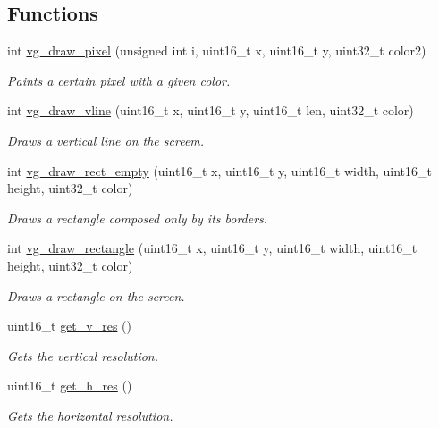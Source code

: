 \subsection*{Functions}
\begin{DoxyCompactItemize}
\item 
int \mbox{\hyperlink{group__videog_ga442a8d042167564d8248fcd57de6b837}{vg\+\_\+draw\+\_\+pixel}} (unsigned int i, uint16\+\_\+t x, uint16\+\_\+t y, uint32\+\_\+t color2)
\begin{DoxyCompactList}\small\item\em Paints a certain pixel with a given color. \end{DoxyCompactList}\item 
int \mbox{\hyperlink{group__videog_ga240fc458a4f42c9396bcc98d47f253e3}{vg\+\_\+draw\+\_\+vline}} (uint16\+\_\+t x, uint16\+\_\+t y, uint16\+\_\+t len, uint32\+\_\+t color)
\begin{DoxyCompactList}\small\item\em Draws a vertical line on the screem. \end{DoxyCompactList}\item 
int \mbox{\hyperlink{group__videog_gac13ab0fea467c2b1f0ea2f9f4a481270}{vg\+\_\+draw\+\_\+rect\+\_\+empty}} (uint16\+\_\+t x, uint16\+\_\+t y, uint16\+\_\+t width, uint16\+\_\+t height, uint32\+\_\+t color)
\begin{DoxyCompactList}\small\item\em Draws a rectangle composed only by its borders. \end{DoxyCompactList}\item 
int \mbox{\hyperlink{group__videog_ga4d53728322f948683b768482bf4906e8}{vg\+\_\+draw\+\_\+rectangle}} (uint16\+\_\+t x, uint16\+\_\+t y, uint16\+\_\+t width, uint16\+\_\+t height, uint32\+\_\+t color)
\begin{DoxyCompactList}\small\item\em Draws a rectangle on the screen. \end{DoxyCompactList}\item 
uint16\+\_\+t \mbox{\hyperlink{group__videog_ga8ecfc1971f8bce697d1e02ebf57e6801}{get\+\_\+v\+\_\+res}} ()
\begin{DoxyCompactList}\small\item\em Gets the vertical resolution. \end{DoxyCompactList}\item 
uint16\+\_\+t \mbox{\hyperlink{group__videog_ga53190a84d33dca987a32592d55b0e764}{get\+\_\+h\+\_\+res}} ()
\begin{DoxyCompactList}\small\item\em Gets the horizontal resolution. \end{DoxyCompactList}\item 

\end{DoxyCompactItemize}
